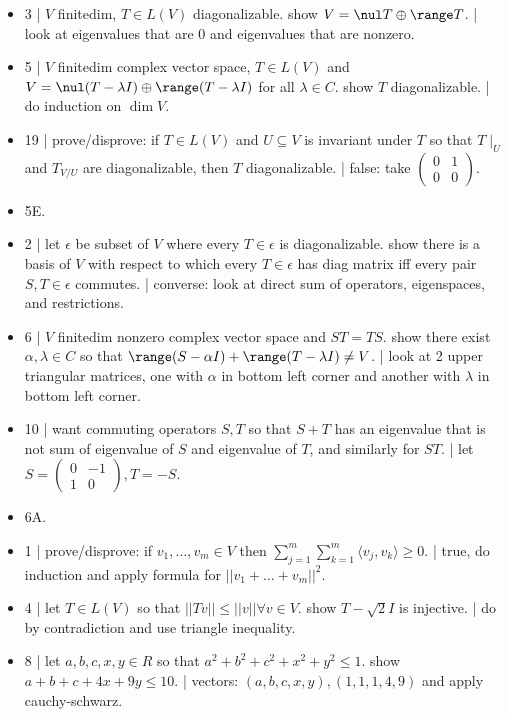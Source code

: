 \begin{itemize}
	\item 3 | $V$ finitedim, $T \in L(V)$ diagonalizable. show $V = \nul T \oplus \range T$. | look at eigenvalues that are 0 and eigenvalues that are nonzero. 
	\item 5 | $V$ finitedim complex vector space, $T \in L(V)$ and $V = \nul (T - \lambda I) \oplus \range (T - \lambda I)$ for all $\lambda \in C$. show $T$ diagonalizable. | do induction on $\dim V$. 
	\item 19 | prove/disprove: if $T \in L(V)$ and $U \subseteq V$ is invariant under $T$ so that $T \mid_U$ and $T_{V/U}$ are diagonalizable, then $T$ diagonalizable. | false: take $\begin{pmatrix} 0 & 1 \\ 0 & 0 \end{pmatrix}$. 
	\item 5E. 
	\item 2 | let $\epsilon$ be subset of $V$ where every $T \in \epsilon$ is diagonalizable. show there is a basis of $V$ with respect to which every $T \in \epsilon$ has diag matrix iff every pair $S,T \in \epsilon$ commutes. | converse: look at direct sum of operators, eigenspaces, and restrictions. 
	\item 6 | $V$ finitedim nonzero complex vector space and $ST=TS$. show there exist $\alpha,\lambda \in C$ so that $\range (S-\alpha I) + \range (T-\lambda I) \neq V$. | look at 2 upper triangular matrices, one with $\alpha$ in bottom left corner and another with $\lambda$ in bottom left corner. 
	\item 10 | want commuting operators $S,T$ so that $S+T$ has an eigenvalue that is not sum of eigenvalue of $S$ and eigenvalue of $T$, and similarly for $ST$. | let $S = \begin{pmatrix} 0 & -1 \\ 1 & 0 \end{pmatrix}, T = -S$. 
	\item 6A. 
	\item 1 | prove/disprove: if $v_1,\dots,v_m \in V$ then $\sum_{j=1}^{m} \sum_{k=1}^{m} \langle v_j,v_k \rangle \geq 0$. | true, do induction and apply formula for $||v_1 + \dots + v_m||^2$. 
	\item 4 | let $T \in L(V)$ so that $||Tv|| \leq ||v|| \forall v \in V$. show $T-\sqrt{2}I$ is injective. | do by contradiction and use triangle inequality. 
	\item 8 | let $a,b,c,x,y \in R$ so that $a^2 + b^2 + c^2 + x^2 + y^2 \leq 1$. show $a+b+c+4x+9y \leq 10$. | vectors: $(a,b,c,x,y), (1,1,1,4,9)$ and apply cauchy-schwarz. 

\end{itemize}
